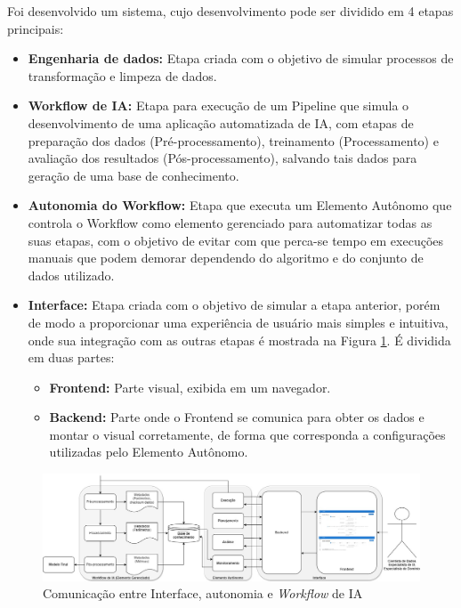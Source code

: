 \documentclass[twocolumn]{article}
\begin{document}
Foi desenvolvido um sistema, cujo desenvolvimento pode ser dividido em 4 etapas principais:

\begin{itemize}
    \item {\textbf{Engenharia de dados:}} Etapa criada com o objetivo de simular processos de transformação e limpeza de dados.
    \item {\textbf{Workflow de IA:}} Etapa para execução de um Pipeline que simula o desenvolvimento de uma aplicação automatizada de IA, com etapas de preparação dos dados (Pré-processamento), treinamento (Processamento) e avaliação dos resultados (Pós-processamento), salvando tais dados para geração de uma base de conhecimento.
    \item {\textbf{Autonomia do Workflow:}} Etapa que executa um Elemento Autônomo que  controla o Workflow como elemento gerenciado para automatizar todas as suas etapas, com o objetivo de evitar com que perca-se tempo em execuções manuais que podem demorar dependendo do algoritmo e do conjunto de dados utilizado.
    \item {\textbf{Interface:}} Etapa criada com o objetivo de simular a etapa anterior, porém de modo a proporcionar uma experiência de usuário mais simples e intuitiva, onde sua integração com as outras etapas é mostrada na Figura \ref{fig:BackendFrontendML}. É dividida em duas partes:
    \begin{itemize}
        \item {\textbf{Frontend:}} Parte visual, exibida em um navegador.
        \item \textbf{{Backend:}} Parte onde o Frontend se comunica para obter os dados e montar o visual corretamente, de forma que corresponda a configurações utilizadas pelo Elemento Autônomo.
    \end{itemize}
\end{itemize}

\begin{figure}[h]
\centering
\includegraphics[scale=0.3]{images/backend-frontend-ml.jpg}
\caption {Comunicação entre Interface, autonomia e \textit{Workflow} de IA}
\label{fig:BackendFrontendML}
\end{figure}
\end{document}

